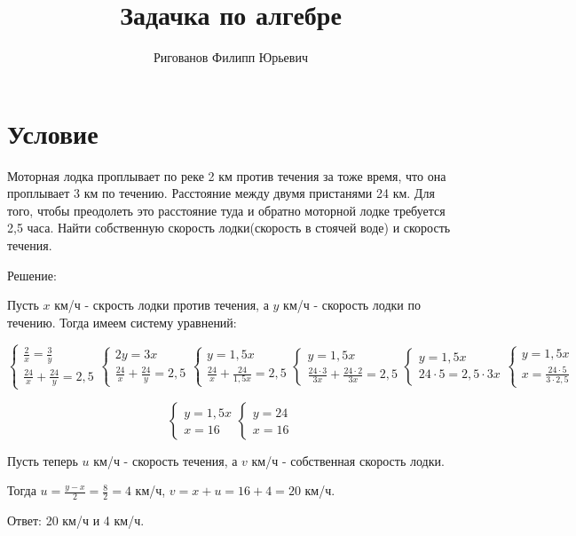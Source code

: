 \documentclass[fleqn]{article}
\title{Задачка по алгебре}
\author{Ригованов Филипп Юрьевич}
\begin{document}
\date{}
\maketitle
\section*{Условие}
Моторная лодка проплывает по реке 2 км против течения за тоже время, что она проплывает 3 км по течению. Расстояние между двумя пристанями 24 км. Для того, чтобы преодолеть это расстояние туда и обратно моторной лодке требуется 2,5 часа. Найти собственную скорость лодки(скорость в стоячей воде) и скорость течения.

Решение:

Пусть $x$ км/ч - скрость лодки против течения, а $y$ км/ч - скорость лодки по течению. Тогда имеем систему уравнений:


$$\begin{cases}
\frac{2}{x}=\frac{3}{y}\\
\frac{24}{x}+\frac{24}{y}=2,5
\end{cases}
\begin{cases}
2y=3x\\
\frac{24}{x}+\frac{24}{y}=2,5
\end{cases}
\begin{cases}
y=1,5x\\
\frac{24}{x}+\frac{24}{1,5x}=2,5
\end{cases}
\begin{cases}
y=1,5x\\
\frac{24\cdot3}{3x}+\frac{24\cdot2}{3x}=2,5
\end{cases}
\begin{cases}
y=1,5x\\
24\cdot5=2,5\cdot3x
\end{cases}
\begin{cases}
y=1,5x\\
x=\frac{24\cdot5}{3\cdot2,5}
\end{cases}
$$

$$
\begin{cases}
y=1,5x\\
x=16
\end{cases}
\begin{cases}
y=24\\
x=16
\end{cases}
$$

Пусть теперь $u$ км/ч - скорость течения, а $v$ км/ч - собственная скорость лодки.

Тогда $u=\frac{y-x}{2}=\frac{8}{2}=4$ км/ч, $v=x+u=16+4=20$ км/ч.

Ответ: 20 км/ч и 4 км/ч.
\end{document}
